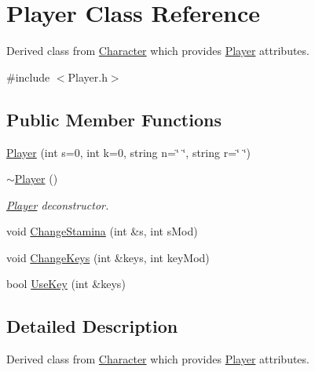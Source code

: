 \hypertarget{classPlayer}{\section{Player Class Reference}
\label{classPlayer}
}


Derived class from \hyperlink{classCharacter}{Character} which provides \hyperlink{classPlayer}{Player} attributes.  




{\ttfamily \#include $<$Player.\-h$>$}

\subsection*{Public Member Functions}
\begin{DoxyCompactItemize}
\item 
\hyperlink{classPlayer_a3f78353312cc3cf41905fdc3accafb6c}{Player} (int s=0, int k=0, string n=\char`\"{} \char`\"{}, string r=\char`\"{} \char`\"{})
\item 
\hypertarget{classPlayer_a749d2c00e1fe0f5c2746f7505a58c062}{\hyperlink{classPlayer_a749d2c00e1fe0f5c2746f7505a58c062}{$\sim$\-Player} ()}\label{classPlayer_a749d2c00e1fe0f5c2746f7505a58c062}

\begin{DoxyCompactList}\small\item\em \hyperlink{classPlayer}{Player} deconstructor. \end{DoxyCompactList}\item 
void \hyperlink{classPlayer_a5bca1aa08cadb57984c488498a2e0e38}{Change\-Stamina} (int \&s, int s\-Mod)
\item 
void \hyperlink{classPlayer_a325d080bde1038593f942b17a5dd6ae2}{Change\-Keys} (int \&keys, int key\-Mod)
\item 
bool \hyperlink{classPlayer_af839bdc1524d571568ea31a34f44f3ab}{Use\-Key} (int \&keys)
\end{DoxyCompactItemize}


\subsection{Detailed Description}
Derived class from \hyperlink{classCharacter}{Character} which provides \hyperlink{classPlayer}{Player} attributes. 

